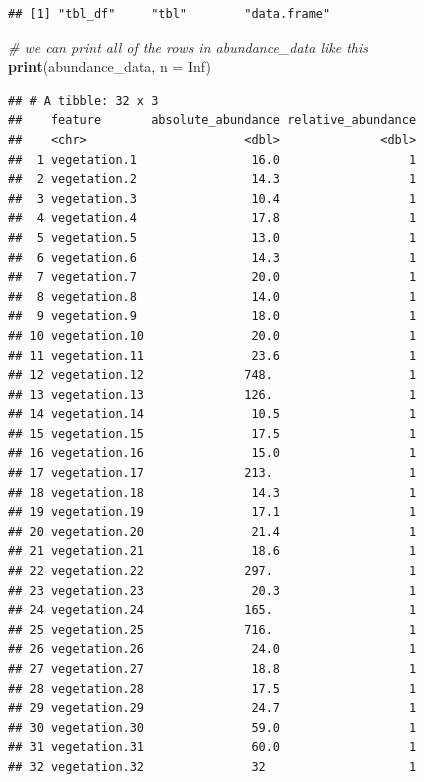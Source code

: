\documentclass[
  12pt,
]{book}
\newenvironment{Shaded}{\begin{snugshade}}{\end{snugshade}}
\newcommand{\CommentTok}[1]{\textcolor[rgb]{0.56,0.35,0.01}{\textit{#1}}}
\newcommand{\DataTypeTok}[1]{\textcolor[rgb]{0.13,0.29,0.53}{#1}}
\newcommand{\KeywordTok}[1]{\textcolor[rgb]{0.13,0.29,0.53}{\textbf{#1}}}
\newcommand{\NormalTok}[1]{#1}
\newcommand{\OtherTok}[1]{\textcolor[rgb]{0.56,0.35,0.01}{#1}}
\begin{document}
\begin{verbatim}
## [1] "tbl_df"     "tbl"        "data.frame"
\end{verbatim}

\begin{Shaded}
\begin{Highlighting}[]
\CommentTok{# we can print all of the rows in abundance_data like this}
\KeywordTok{print}\NormalTok{(abundance_data, }\DataTypeTok{n =} \OtherTok{Inf}\NormalTok{)}
\end{Highlighting}
\end{Shaded}

\begin{verbatim}
## # A tibble: 32 x 3
##    feature       absolute_abundance relative_abundance
##    <chr>                      <dbl>              <dbl>
##  1 vegetation.1                16.0                  1
##  2 vegetation.2                14.3                  1
##  3 vegetation.3                10.4                  1
##  4 vegetation.4                17.8                  1
##  5 vegetation.5                13.0                  1
##  6 vegetation.6                14.3                  1
##  7 vegetation.7                20.0                  1
##  8 vegetation.8                14.0                  1
##  9 vegetation.9                18.0                  1
## 10 vegetation.10               20.0                  1
## 11 vegetation.11               23.6                  1
## 12 vegetation.12              748.                   1
## 13 vegetation.13              126.                   1
## 14 vegetation.14               10.5                  1
## 15 vegetation.15               17.5                  1
## 16 vegetation.16               15.0                  1
## 17 vegetation.17              213.                   1
## 18 vegetation.18               14.3                  1
## 19 vegetation.19               17.1                  1
## 20 vegetation.20               21.4                  1
## 21 vegetation.21               18.6                  1
## 22 vegetation.22              297.                   1
## 23 vegetation.23               20.3                  1
## 24 vegetation.24              165.                   1
## 25 vegetation.25              716.                   1
## 26 vegetation.26               24.0                  1
## 27 vegetation.27               18.8                  1
## 28 vegetation.28               17.5                  1
## 29 vegetation.29               24.7                  1
## 30 vegetation.30               59.0                  1
## 31 vegetation.31               60.0                  1
## 32 vegetation.32               32                    1
\end{verbatim}
\end{document}
